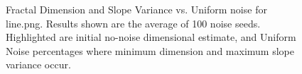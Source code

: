 \documentclass[12pt, oneside]{book}
\begin{document}
\begin{figure}[!b]
  \centering
  \caption[Fractal Dimension and Slope Variance vs. Uniform noise for line.png.]{Fractal Dimension and Slope Variance vs. Uniform noise for line.png.  Results shown are the average of 100 noise seeds.  Highlighted are initial no-noise dimensional estimate, and Uniform Noise percentages where minimum dimension and maximum slope variance occur.}
  \label{fig:line_uniform_result}
\end{figure}
\end{document}
